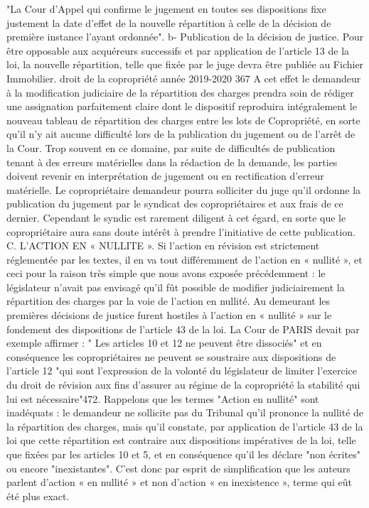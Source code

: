 "La Cour d'Appel qui confirme le jugement en toutes ses dispositions fixe justement la date d'effet de la nouvelle répartition à celle de la décision de première instance l'ayant ordonnée".
b- Publication de la décision de justice.
Pour être opposable aux acquéreurs successifs et par application de l'article 13 de la loi, la nouvelle répartition, telle que fixée par le juge devra être publiée au Fichier Immobilier.
droit de la copropriété année 2019-2020
367
A cet effet le demandeur à la modification judiciaire de la répartition des charges prendra soin de rédiger une assignation parfaitement claire dont le dispositif reproduira intégralement le nouveau tableau de répartition des charges entre les lots de Copropriété, en sorte qu'il n'y ait aucune difficulté lors de la publication du jugement ou de l'arrêt de la Cour.
Trop souvent en ce domaine, par suite de difficultés de publication tenant à des erreurs matérielles dans la rédaction de la demande, les parties doivent revenir en interprétation de jugement ou en rectification d'erreur matérielle.
Le copropriétaire demandeur pourra solliciter du juge qu’il ordonne la publication du jugement par le syndicat des copropriétaires et aux frais de ce dernier. Cependant le syndic est rarement diligent à cet égard, en sorte que le copropriétaire aura sans doute intérêt à prendre l’initiative de cette publication.
C. L'ACTION EN « NULLITE ».
Si l'action en révision est strictement réglementée par les textes, il en va tout différemment de l'action en « nullité », et ceci pour la raison très simple que nous avons exposée précédemment : le législateur n'avait pas envisagé qu'il fût possible de modifier judiciairement la répartition des charges par la voie de l'action en nullité.
Au demeurant les premières décisions de justice furent hostiles à l'action en « nullité » sur le fondement des dispositions de l'article 43 de la loi. La Cour de PARIS devait par exemple affirmer : " Les articles 10 et 12 ne peuvent être dissociés" et en conséquence les copropriétaires ne peuvent se soustraire aux dispositions de l'article 12 "qui sont l'expression de la volonté du législateur de limiter l'exercice du droit de révision aux fins d'assurer au régime de la copropriété la stabilité qui lui est nécessaire"472.
Rappelons que les termes "Action en nullité" sont inadéquats : le demandeur ne sollicite pas du Tribunal qu'il prononce la nullité de la répartition des charges, mais qu'il constate, par application de l'article 43 de la loi que cette répartition est contraire aux dispositions impératives de la loi, telle que fixées par les articles 10 et 5, et en conséquence qu'il les déclare "non écrites" ou encore "inexistantes". C'est donc par esprit de simplification que les auteurs parlent d'action « en nullité » et non d'action « en inexistence », terme qui eût été plus exact.
